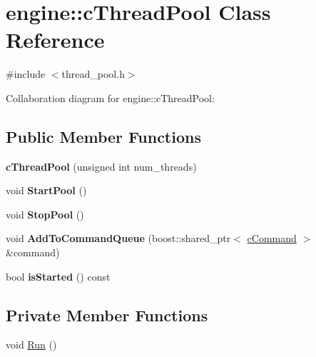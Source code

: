 \hypertarget{classengine_1_1cThreadPool}{\section{engine\-:\-:c\-Thread\-Pool Class Reference}
\label{classengine_1_1cThreadPool}
}


{\ttfamily \#include $<$thread\-\_\-pool.\-h$>$}



Collaboration diagram for engine\-:\-:c\-Thread\-Pool\-:
\subsection*{Public Member Functions}
\begin{DoxyCompactItemize}
\item 
\hypertarget{classengine_1_1cThreadPool_a1cef23416a63c1a652d07b074a40b42e}{{\bfseries c\-Thread\-Pool} (unsigned int num\-\_\-threads)}\label{classengine_1_1cThreadPool_a1cef23416a63c1a652d07b074a40b42e}

\item 
\hypertarget{classengine_1_1cThreadPool_a97cf0269aebd226e59d973a89181d709}{void {\bfseries Start\-Pool} ()}\label{classengine_1_1cThreadPool_a97cf0269aebd226e59d973a89181d709}

\item 
\hypertarget{classengine_1_1cThreadPool_aeafab9fa5546e10b0deebff1e8df60d9}{void {\bfseries Stop\-Pool} ()}\label{classengine_1_1cThreadPool_aeafab9fa5546e10b0deebff1e8df60d9}

\item 
\hypertarget{classengine_1_1cThreadPool_a99a6a1dc9361e4c17786ad32b17e7706}{void {\bfseries Add\-To\-Command\-Queue} (boost\-::shared\-\_\-ptr$<$ \hyperlink{classengine_1_1cCommand}{c\-Command} $>$ \&command)}\label{classengine_1_1cThreadPool_a99a6a1dc9361e4c17786ad32b17e7706}

\item 
\hypertarget{classengine_1_1cThreadPool_a207b8bcf506d3cd151f0fc815772111c}{bool {\bfseries is\-Started} () const }\label{classengine_1_1cThreadPool_a207b8bcf506d3cd151f0fc815772111c}

\end{DoxyCompactItemize}
\subsection*{Private Member Functions}
\begin{DoxyCompactItemize}
\item 
void \hyperlink{classengine_1_1cThreadPool_af573f11026d6b6079c56af7e50df5ca6}{Run} ()
\end{DoxyCompactItemize}
